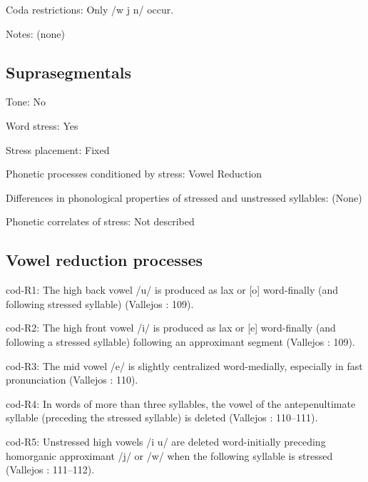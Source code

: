 {\begin{appendixdesc}
\item[Coda restrictions:] Only /w j n/ occur.

\item[Notes:] (none)
\end{appendixdesc}
\subsection*{Suprasegmentals}
\begin{appendixdesc}
\item[Tone:] No

\item[Word stress:] Yes

\item[Stress placement:] Fixed

\item[Phonetic processes conditioned by stress:] Vowel Reduction

\item[Differences in phonological properties of stressed and unstressed syllables:] (None)

\item[Phonetic correlates of stress:] Not described
\end{appendixdesc}
\subsection*{Vowel reduction processes}
\begin{appendixdesc}

\item[cod-R1:] The high back vowel /u/ is produced as lax or [o] word-finally (and following stressed syllable) (Vallejos \citealt{Yopán2010}: 109).

\item[cod-R2:] The high front vowel /i/ is produced as lax or [e] word-finally (and following a stressed syllable) following an approximant segment (Vallejos \citealt{Yopán2010}: 109).

\item[cod-R3:] The mid vowel /e/ is slightly centralized word-medially, especially in fast pronunciation (Vallejos \citealt{Yopán2010}: 110).

\item[cod-R4:] In words of more than three syllables, the vowel of the antepenultimate syllable (preceding the stressed syllable) is deleted (Vallejos \citealt{Yopán2010}: 110--111).

\item[cod-R5:] Unstressed high vowels /i u/ are deleted word-initially preceding homorganic approximant /j/ or /w/ when the following syllable is stressed (Vallejos \citealt{Yopán2010}: 111--112).
\end{appendixdesc}
}
